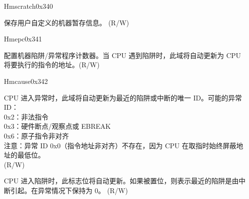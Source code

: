 \begin{register}{H}{mscratch}{0x340}\label{regdesc:LPMSCRATCH}
%
\regnewline%
\begin{regdesc}\begin{reglist}
\label{fielddesc:LPMSCRATCH}\item [MSCRATCH] 保存用户自定义的机器暂存信息。 (R/W)
\end{reglist}\end{regdesc}
\end{register}

\begin{register}{H}{mepc}{0x341}\label{regdesc:LPMEPC}
%
\regnewline%
\begin{regdesc}\begin{reglist}
\label{fielddesc:LPMEPC}\item [MEPC] 配置机器陷阱/异常程序计数器。当 CPU 遇到陷阱时，此域将自动更新为 CPU 将要执行的指令的地址。(R/W)
\end{reglist}\end{regdesc}
\end{register}

\begin{register}{H}{mcause}{0x342}\label{regdesc:LPMCAUSE}
%
%
%
\regnewline%
\begin{regdesc}\begin{reglist}
\label{fielddesc:LPMCAUSECODE}\item [Exception Code] CPU 进入异常时，此域将自动更新为最近的陷阱或中断的唯一 ID。可能的异常 ID：\\
0x2：非法指令\\
0x3：硬件断点/观察点或 EBREAK\\
0x6：原子指令非对齐\\
注意：异常 ID 0x0（指令地址非对齐）不存在，因为 CPU 在取指时始终屏蔽地址的最低位。\\
(R/W)
\label{fielddesc:LPMCAUSEINT}\item [Interrupt Flag] CPU 进入陷阱时，此标志位将自动更新。如果被置位，则表示最近的陷阱是由中断引起。在异常情况下保持为 0。 (R/W)
\end{reglist}\end{regdesc}
\end{register}

